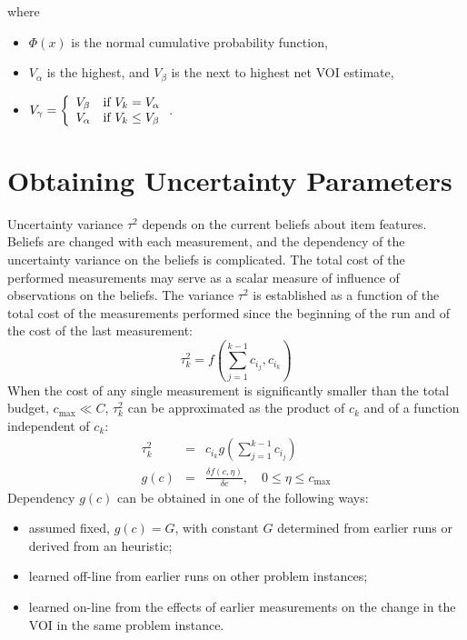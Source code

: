 where
\begin{itemize}
\item $\Phi(x)$ is the normal cumulative probability function,
\item $V_\alpha$ is the highest, and $V_\beta$ is the next to highest net VOI estimate, 
\item $V_\gamma=\left\{ 
  \begin{array}{l l}
    V_\beta & \mbox{if $V_k=V_\alpha$} \\
    V_\alpha & \mbox{if $V_k\le V_\beta$}
  \end{array}\right.$.
\end{itemize}

\section{ Obtaining Uncertainty Parameters}
\label{sec:raticomp-uncertainty}

Uncertainty variance $\tau^2$ depends on the current beliefs about
item features. Beliefs are changed with each measurement, and the
dependency of the uncertainty variance on the beliefs is
complicated. The total cost of the performed measurements may serve as
a scalar measure of influence of observations on the beliefs.  The
variance $\tau^2$ is established as a function of the total cost of
the measurements performed since the beginning of the run and of
the cost of the last measurement:
\begin{equation}
\label{eq:tau-of-cost}
\tau_k^2 = f\left(\sum_{j=1}^{k-1}c_{i_j},c_{i_k}\right)
\end{equation}
When the cost of any single measurement is significantly smaller than
the total budget, $c_{\max}\ll C$, $\tau_k^2$ can be approximated as
the product of $c_k$ and of a function independent of $c_k$:
\begin{eqnarray}
\label{eq:tau-of-cost-factorized}
\tau_k^2&=&c_{i_k} g\left(\sum_{j=1}^{k-1}c_{i_j}\right)\nonumber\\
g(c)&=&\frac {\delta f(c,\eta)} {\delta c},\quad 0 \le \eta \le c_{\max}
\end{eqnarray}
Dependency $g(c)$ can be obtained in one of the following ways:
\begin{itemize}
\item assumed fixed, $g(c)=G$, with constant $G$ determined from
  earlier runs or derived from an heuristic;
\item learned off-line from earlier runs on other problem instances;
\item learned on-line from the effects of earlier measurements on the
  change in the VOI in the same problem instance.
\end{itemize}

